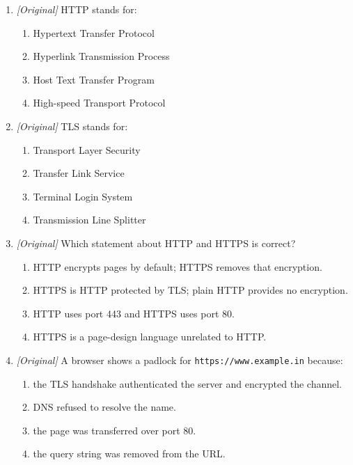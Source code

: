 \documentclass[11pt]{article}
\begin{document}
\begin{enumerate}[label=\textbf{Q\arabic*.}, leftmargin=*]
\begin{enumerate}[label=\Alph*.]
      server) for the address.
    \item guessing the address from the URL path.
    \item reading the page content over HTTP first.
    \item copying the port number into the address field.
  \end{enumerate}
\item \textit{[Original]} HTTP stands for:
  \begin{enumerate}[label=\Alph*.]
    \item Hypertext Transfer Protocol
    \item Hyperlink Transmission Process
    \item Host Text Transfer Program
    \item High-speed Transport Protocol
  \end{enumerate}
\item \textit{[Original]} TLS stands for:
  \begin{enumerate}[label=\Alph*.]
    \item Transport Layer Security
    \item Transfer Link Service
    \item Terminal Login System
    \item Transmission Line Splitter
  \end{enumerate}
\item \textit{[Original]} Which statement about HTTP and HTTPS is correct?
  \begin{enumerate}[label=\Alph*.]
    \item HTTP encrypts pages by default; HTTPS removes that encryption.
    \item HTTPS is HTTP protected by TLS; plain HTTP provides no encryption.
    \item HTTP uses port 443 and HTTPS uses port 80.
    \item HTTPS is a page-design language unrelated to HTTP.
  \end{enumerate}
\item \textit{[Original]} A browser shows a padlock for
  \texttt{https://www.example.in} because:
  \begin{enumerate}[label=\Alph*.]
    \item the TLS handshake authenticated the server and encrypted the
      channel.
    \item DNS refused to resolve the name.
    \item the page was transferred over port 80.
    \item the query string was removed from the URL.

\end{enumerate}
\end{enumerate}
\end{document}

